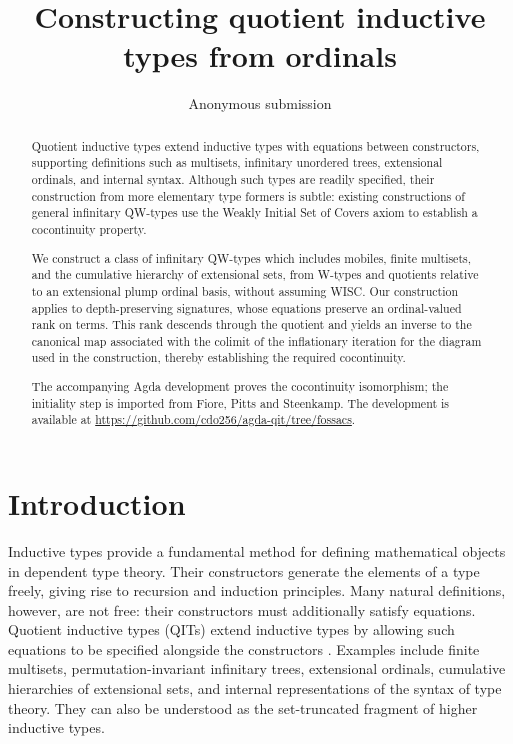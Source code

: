 \documentclass[runningheads]{llncs}
\title{Constructing quotient inductive types from ordinals}
\author{Anonymous submission}
\institute{}
\date{}
\begin{document}
\maketitle


\begin{abstract}

Quotient inductive types extend inductive types with equations between
constructors, supporting definitions such as multisets, infinitary
unordered trees, extensional ordinals, and internal syntax. Although
such types are readily specified, their construction from more
elementary type formers is subtle: existing constructions of general
infinitary QW-types use the Weakly Initial Set of Covers axiom to
establish a cocontinuity property.

We construct a class of infinitary QW-types which includes mobiles, finite
multisets, and the cumulative hierarchy of extensional sets, from
W-types and quotients relative to an extensional plump ordinal basis,
without assuming WISC. Our construction applies to
depth-preserving
signatures, whose equations preserve an ordinal-valued rank on terms.
This rank descends through the quotient and
yields an inverse to the canonical map associated with the colimit of
the inflationary iteration for the diagram used in the construction,
thereby establishing the required cocontinuity.

The accompanying Agda development proves the cocontinuity isomorphism;
the initiality step is imported from Fiore, Pitts and Steenkamp. The
development is available at
\url{https://github.com/cdo256/agda-qit/tree/fossacs}.

\end{abstract}

\section{Introduction}\label{introduction}


Inductive types provide a fundamental method for defining mathematical
objects in dependent type theory. Their constructors generate the
elements of a type freely, giving rise to recursion and induction
principles. Many natural definitions, however, are not free: their
constructors must additionally satisfy equations. Quotient inductive
types (QITs) extend inductive types by allowing such equations to be
specified alongside the constructors
\citep{altenkirch2016-qiit}. Examples include finite
multisets, permutation-invariant infinitary trees, extensional ordinals,
cumulative hierarchies of extensional sets, and internal representations
of the syntax of type theory. They can also be understood as the
set-truncated fragment of higher inductive
types.\citep{altenkirch2016-type-theory-qit}
\end{document}
